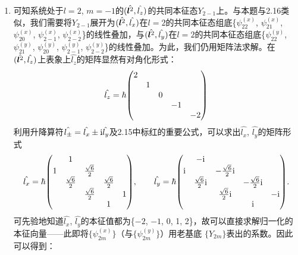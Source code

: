 \begin{enumerate}[label=2.\arabic*, leftmargin=-0.5mm]
\item
可知系统处于$l=2$, $m=-1$的$(\hat{\boldsymbol{l}^2},\hat{l_z})$的共同本征态$Y_{2-1}$上。与本题与2.16类似，我们需要将$Y_{2-1}$展开为$(\hat{\boldsymbol{l}^2},\hat{l_x})$在$l=2$的共同本征态组底\{$\psi^{(x)}_{22}$, $\psi^{(x)}_{21}$, $\psi^{(x)}_{20}$, $\psi^{(x)}_{2-1}$, $\psi^{(x)}_{2-2}$\}的线性叠加，与$(\hat{\boldsymbol{l}^2},\hat{l_y})$在$l=2$的共同本征态组底\{$\psi^{(y)}_{22}$, $\psi^{(y)}_{21}$, $\psi^{(y)}_{20}$, $\psi^{(y)}_{2-1}$, $\psi^{(y)}_{2-2}$\}的线性叠加。为此，我们仍用矩阵法求解。在$(\hat{\boldsymbol{l}^2},\hat{l_z})$上表象上$\hat{l_z}$的矩阵显然有对角化形式：
\[\hat{l_z}=\hbar\mqty(\dmat{2,1,0,-1,-2})\]
利用升降算符$\hat{l_\pm}=\hat{l_x}\pm \mathrm{i}\hat{l_y}$及2.15中标红的重要公式，可以求出$\hat{l_x}$, $\hat{l_y}$的矩阵形式
\[\hat{l_x}=\hbar\mqty(&1&&&\\1&&\frac{\sqrt{6}}{2}&&\\&\frac{\sqrt{6}}{2}&&\frac{\sqrt{6}}{2}&\\&&\frac{\sqrt{6}}{2}&&1\\&&&1&),\qquad
\hat{l_y}=\hbar\mqty(&-\im&&&\\\im&&-\frac{\sqrt{6}}{2}\im&&\\&\frac{\sqrt{6}}{2}\im&&-\frac{\sqrt{6}}{2}\im&\\&&\frac{\sqrt{6}}{2}\im&&-\im\\&&&\im&).\]
可先验地知道$\hat{l_x}$, $\hat{l_y}$的本征值都为\{$-2$, $-1$, 0, 1, 2\}，故可以直接求解归一化的本征向量——此即将$\{\psi^{(x)}_{2m}\}$（与$\{\psi^{(y)}_{2m}\}$）用老基底
$\{Y_{2m}\}$表出的系数。因此可以得到：
\end{enumerate}
